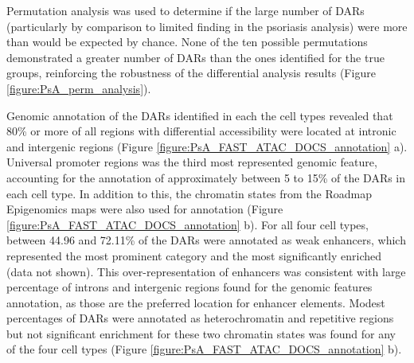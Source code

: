 Permutation analysis was used to determine if the large number of DARs (particularly by comparison to limited finding in the psoriasis analysis) were more than would be expected by chance. None of the ten possible permutations demonstrated a greater number of DARs than the ones identified for the true groups, reinforcing the robustness of the differential analysis results (Figure \ref{figure:PsA_perm_analysis}).

  
Genomic annotation of the DARs identified in each the cell types revealed that 80\% or more of all regions with differential accessibility were located at intronic and intergenic regions (Figure \ref{figure:PsA_FAST_ATAC_DOCS_annotation} a). Universal promoter regions was the third most represented genomic feature, accounting for the annotation of approximately between 5 to 15\% of the DARs in each cell type. In addition to this, the chromatin states from the Roadmap Epigenomics maps were also used for annotation (Figure \ref{figure:PsA_FAST_ATAC_DOCS_annotation} b). For all four cell types,  between 44.96 and 72.11\% of the DARs were annotated as weak enhancers, which represented the most prominent category and the most significantly enriched (data not shown). This over-representation of enhancers was consistent with large percentage of introns and intergenic regions found for the genomic features annotation, as those are the preferred location for enhancer elements. Modest percentages of DARs were annotated as heterochromatin and repetitive regions but not significant enrichment for these two chromatin states was found for any of the four cell types (Figure \ref{figure:PsA_FAST_ATAC_DOCS_annotation} b).
%

